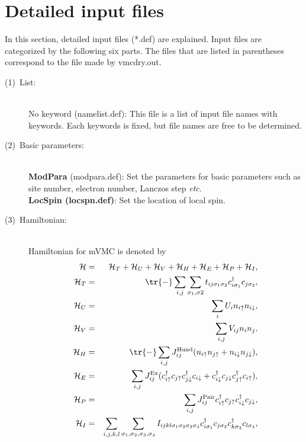 \newpage
\section{Detailed input files}
\label{Ch:HowToExpert}
In this section, detailed input files (*.def) are explained. Input files are categorized by the following six parts.
The files that are listed in parentheses correspond to the file made by vmcdry.out.

\begin{description}
\item[(1)~List:]
~\\{No keyword} (namelist.def):
This file is a list of input file names with keywords. Each keywords is fixed, but file names are free to be determined.  
\item[(2)~Basic parameters:]
~\\{\bf ModPara} (modpara.def): Set the parameters for basic parameters such as site number, electron number, Lanczos step {\it etc}.
~\\{\bf LocSpin (locspn.def)}: Set the location of local spin. 
\item[(3)~Hamiltonian:] 
~\\Hamiltonian for mVMC is denoted by 
\begin{eqnarray}
{\cal H}&=&{\cal H}_T+{\cal H}_U+{\cal H}_V+{\cal H}_H+{\cal H}_E+{\cal H}_P+{\cal H}_I,\\
{\cal H}_T&=&\tr{-}\sum_{i, j}\sum_{\sigma_1, \sigma2}t_{ij\sigma_1\sigma_2} c_{i\sigma_1}^{\dag}c_{j\sigma_2},\\
{\cal H}_U&=&\sum_{i} U_i n_ {i \uparrow}n_{i \downarrow},\\
{\cal H}_V&=&\sum_{i,j} V_{ij}n_ {i}n_{j},\\
{\cal H}_H&=&\tr{-}\sum_{i,j}J_{ij}^{\rm Hund} (n_{i\uparrow}n_{j\uparrow}+n_{i\downarrow}n_{j\downarrow}),\\
{\cal H}_E&=&\sum_{i,j}J_{ij}^{\rm Ex} (c_ {i \uparrow}^{\dag}c_{j\uparrow}c_{j \downarrow}^{\dag}c_{i  \downarrow}+c_ {i \downarrow}^{\dag}c_{j\downarrow}c_{j \uparrow}^{\dag}c_{i  \uparrow}),\\
{\cal H}_P&=&\sum_{i,j}J_{ij}^{\rm Pair} c_ {i \uparrow}^{\dag}c_{j\uparrow}c_{i \downarrow}^{\dag}c_{j  \downarrow},\\
{\cal H}_I&=&\sum_{i,j,k,l}\sum_{\sigma_1,\sigma_2, \sigma_3, \sigma_4}
I_{ijkl\sigma_1\sigma_2\sigma_3\sigma_4}c_{i\sigma_1}^{\dagger}c_{j\sigma_2}c_{k\sigma_3}^{\dagger}c_{l\sigma_4}, 

\end{eqnarray}
\end{description}
